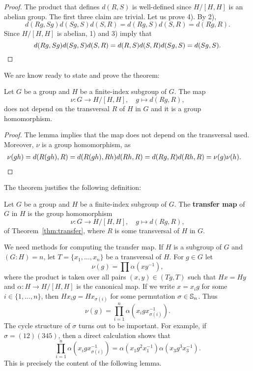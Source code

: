 \begin{proof}
	The product that defines $d(R,S)$ is well-defined since $H/[H,H]$ is 
	an abelian group. The first three claim are trivial. Let us prove
	4). By 2), 
	\[
		d(Rg,Sg)d(Sg,S)d(S,R)=d(Rg,S)d(S,R)=d(Rg,R).
	\]
	Since $H/[H,H]$ is abelian, 1) and 3) imply that 	
	\[
		d(Rg,Sg)d(Sg,S)d(S,R)=d(R,S)d(S,R)d(Sg,S)=d(Sg,S).\qedhere
	\]
\end{proof}

We are know ready to state and 
prove the theorem: 

\begin{theorem}
	\label{thm:transfer}
	Let $G$ be a group and $H$ be a finite-index subgroup of $G$. The map 	
	\[
		\nu\colon G\to H/[H,H],\quad
		g\mapsto d(Rg,R),
	\]
	does not depend on the transversal $R$ of $H$ in $G$ and it is a group
	homomorphism. 
\end{theorem}

\begin{proof}
	The lemma implies that the map does not depend on the transversal used. 
	Moreover, $\nu$ is a group homomorphism, as 
	\begin{align*}
		\nu(gh)&=d(R(gh),R)
		=d(R(gh),Rh)d(Rh,R)
		=d(Rg,R)d(Rh,R)=\nu(g)\nu(h).\qedhere
	\end{align*}
\end{proof}

The theorem justifies the following definition: 

\begin{definition}
	Let $G$ be a group and $H$ be a finite-index subgroup of $G$. The
	\textbf{transfer map} of $G$ in $H$ is the group homomorphism 
	\[
		\nu\colon G\to H/[H,H],
		\quad
		g\mapsto d(Rg,R),
	\]
	of Theorem~\ref{thm:transfer}, where $R$ is some transversal of $H$ in $G$.
\end{definition}

We need methods for computing the transfer map. If $H$ is a subgroup of 
$G$
and $(G:H)=n$, let $T=\{x_1,\dots,x_n\}$ be a transversal of $H$. For $g\in G$ let  
\[
	\nu(g)=\prod \alpha(xy^{-1}),
\]
where the product is taken over all pairs $(x,y)\in (Tg,T)$ such that $Hx=Hy$
and $\alpha\colon H\to H/[H,H]$ is the canonical map. 
If we write 
$x=x_ig$ for some $i\in\{1,\dots,n\}$, then  
$Hx_ig=Hx_{\sigma(i)}$ for some permutation $\sigma\in\mathbb{S}_n$. Thus 
\[
	\nu(g)=\prod_{i=1}^n\alpha(x_igx_{\sigma(i)}^{-1}).
\]
The cycle structure of $\sigma$ turns out to be important. 
For example, if $\sigma=(12)(345)$, then a direct calculation shows that 
\[
\prod_{i=1}^n\alpha\left(x_igx_{\sigma(i)}^{-1}\right)
=\alpha(x_1g^2x_1^{-1})\alpha(x_3g^3x_3^{-1}).
\]
This is precisely the content of the following lemma. 



